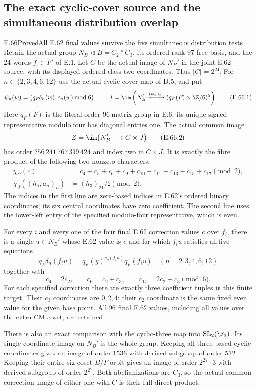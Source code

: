 \subsection{The exact cyclic-cover source and the simultaneous distribution overlap}

\begin{statement}{E.66}{Proved}{All E.62 final values survive the five simultaneous distribution tests}
Retain the actual group $N_B\triangleleft B=C_2*C_3$, its ordered
rank-$97$ free basis, and the $24$ words $f_i\in F'$ of E.1.
Let $C$ be the actual image of $N_B'$ in the joint E.62 source,
with its displayed ordered class-two coordinates. Thus $|C|=2^{24}$.
For $n\in\{2,3,4,6,12\}$ use the actual cyclic-cover map of D.5,
and put
\[
 \psi_n(w)=\bigl(q_F\delta_n(w),c_n(w)\bmod6\bigr),\qquad
 J=\im\left(N_B'\xrightarrow{(\psi_n)_n}
                (q_F(F)\times\Z/6)^5\right).
 \tag{E.66.1}
\]
Here $q_F(F)$ is the literal order-$96$ matrix group in E.6;
its unique signed representative modulo four has diagonal entries one.
The actual common image
\[
 Z=\im\bigl(N_B'\longrightarrow C\times J\bigr)
 \tag{E.66.2}
\]
has order $356\,241\,767\,399\,424$ and index two in $C\times J$.
It is exactly the fibre product of the following two nonzero characters:
\[
 \begin{split}
 \chi_C(c)&=c_4+c_5+c_6+c_9+c_{10}+c_{11}
                   +c_{13}+c_{15}+c_{17}\pmod2,\\
 \chi_J((h_n,a_n)_n)&=(h_3)_{21}/2\pmod2.
 \end{split}
 \tag{E.66.3}
\]
The indices in the first line are zero-based indices in E.62's
ordered binary coordinates; its six central coordinates have zero
coefficient. The second line uses the lower-left entry of the
specified modulo-four representative, which is even.

For every $i$ and every one of the four final E.62 correction
values $c$ over $f_i$, there is a single $u\in N_B'$ whose E.62
value is $c$ and for which $f_i u$ satisfies all five equations
\[
 q_F\delta_n(f_i u)=q_F(y)^{c_n(f_i u)}q_F(f_i u)
 \quad(n=2,3,4,6,12)
 \tag{E.66.4}
\]
together with
\[
 c_4=2c_2,\qquad c_6=c_2+c_3,\qquad
 c_{12}=2c_2+c_3\pmod6.
 \tag{E.66.5}
\]
For each specified correction there are exactly three coefficient
tuples in this finite target. Their $c_3$ coordinates are $0,2,4$;
their $c_2$ coordinate is the same fixed even value for the given
base point. All $96$ final E.62 values, including all values over
the extra CM coset, are retained.

There is also an exact comparison with the cyclic-three map into
$\mathrm{SL}_2(\F_3)$. Its single-coordinate image on $N_B'$ is
the whole group. Keeping all three based cyclic coordinates gives
an image of order $1536$ with derived subgroup of order $512$.
Keeping their entire six-coset $B/F$ orbit gives an image of
order $2^{27}\cdot3$ with derived subgroup of order $2^{27}$.
Both abelianizations are $C_3$, so the actual common correction
image of either one with $C$ is their full direct product.


\end{statement}
